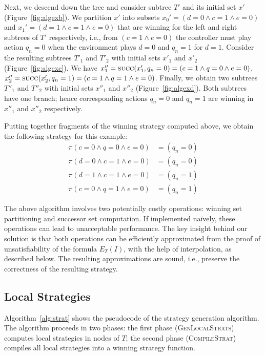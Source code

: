 Next, we descend down the tree and consider subtree $T'$ and its initial set $x'$ (Figure~\ref{fig:algexb}).  We partition $x'$ into subsets $x_0' = (d = 0 \land c = 1 \land e = 0)$ and $x_1' = (d = 1 \land c = 1 \land e = 0)$ that are winning for the left and right subtrees of $T'$ respectively, i.e., from $(c = 1 \land e = 0)$ the controller must play action $q_n = 0$ when the environment plays $d = 0$ and $q_n = 1$ for $d = 1$.  Consider the resulting subtrees $T'_1$ and $T'_2$ with initial sets $x'_1$ and $x'_2$ (Figure~\ref{fig:algexc}).  We have $x''_1 = \textsc{succ}(x'_1, q_n = 0) = (c = 1 \land q = 0 \land e = 0)$, $x''_2 = \textsc{succ}(x'_2, q_n = 1) = (c = 1 \land q = 1 \land e = 0)$.  Finally, we obtain two subtrees $T''_1$ and $T''_2$ with initial sets $x''_1$ and $x''_2$ (Figure~\ref{fig:algexd}).  Both subtrees have one branch; hence corresponding actions $q_n = 0$ and $q_n = 1$ are winning in $x''_1$ and $x''_2$ respectively.

Putting together fragments of the winning strategy computed above, we obtain the following strategy for this example:
\begin{align*}
    \pi(c = 0 \land q = 0 \land e = 0) &= (q_n = 0) \\
    \pi(d = 0 \land c = 1 \land e = 0) &= (q_n = 0) \\
    \pi(d = 1 \land c = 1 \land e = 0) &= (q_n = 1) \\
    \pi(c = 0 \land q = 1 \land e = 0) &= (q_n = 1)
\end{align*}

The above algorithm involves two potentially costly operations: winning set partitioning and successor set computation.  If implemented na\"ively, these operations can lead to unacceptable performance.  The key insight behind our solution is that both operations can be efficiently approximated from the proof of unsatisfiability of the formula $E_T(I)$, with the help of interpolation, as described below.  The resulting approximations are sound, i.e., preserve the correctness of the resulting strategy.

\subsection{Local Strategies}

Algorithm~\ref{alg:strat} shows the pseudocode of the strategy generation algorithm.  The algorithm proceeds in two phases: the first phase (\textsc{GenLocalStrats}) computes local strategies in nodes of $T$; the second phase (\textsc{CompileStrat}) compiles all local strategies into a winning strategy function.

